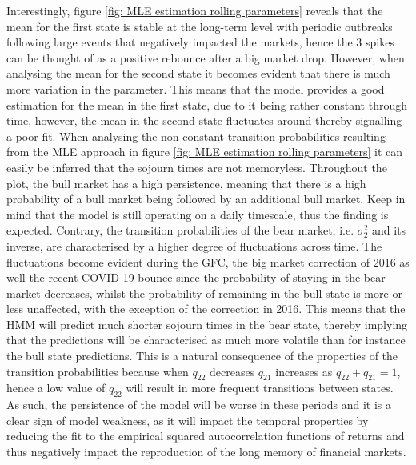 Interestingly, figure \ref{fig: MLE estimation rolling parameters} reveals that the mean for the first state is stable at the long-term level with periodic outbreaks following large events that negatively impacted the markets, hence the 3 spikes can be thought of as a positive rebounce after a big market drop. However, when analysing the mean for the second state it becomes evident that there is much more variation in the parameter. This means that the model provides a good estimation for the mean in the first state, due to it being rather constant through time, however, the mean in the second state fluctuates around thereby signalling a poor fit. When analysing the non-constant transition probabilities resulting from the MLE approach in figure \ref{fig: MLE estimation rolling parameters} it can easily be inferred that the sojourn times are not memoryless. Throughout the plot, the bull market has a high persistence, meaning that there is a high probability of a bull market being followed by an additional bull market. Keep in mind that the model is still operating on a daily timescale, thus the finding is expected. Contrary, the transition probabilities of the bear market, i.e. $\sigma_2^2$ and its inverse, are characterised by a higher degree of fluctuations across time. The fluctuations become evident during the GFC, the big market correction of 2016 as well the recent COVID-19 bounce since the probability of staying in the bear market decreases, whilst the probability of remaining in the bull state is more or less unaffected, with the exception of the correction in 2016. This means that the HMM will predict much shorter sojourn times in the bear state, thereby implying that the predictions will be characterised as much more volatile than for instance the bull state predictions. This is a natural consequence of the properties of the transition probabilities because when $q_{22}$ decreases $q_{21}$ increases as $q_{22} + q_{21} = 1$, hence a low value of $q_{22}$ will result in more frequent transitions between states. As such, the persistence of the model will be worse in these periods and it is a clear sign of model weakness, as it will impact the temporal properties by reducing the fit to the empirical squared autocorrelation functions of returns and thus negatively impact the reproduction of the long memory of financial markets. 

